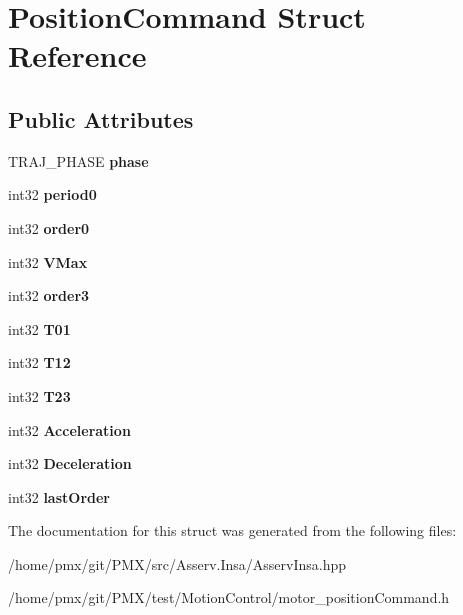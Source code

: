 \hypertarget{structPositionCommand}{}\section{Position\+Command Struct Reference}
\label{structPositionCommand}
\subsection*{Public Attributes}
\begin{DoxyCompactItemize}
\item 
\mbox{\label{structPositionCommand_ad9d68717b1ee8ccb3eb1b2e0083fffc1}} 
T\+R\+A\+J\+\_\+\+P\+H\+A\+SE {\bfseries phase}
\item 
\mbox{\label{structPositionCommand_a3e8302107de7d57977348d9a7909f83a}} 
int32 {\bfseries period0}
\item 
\mbox{\label{structPositionCommand_ab129ddd9246bd3b34c1eb25953fa55cb}} 
int32 {\bfseries order0}
\item 
\mbox{\label{structPositionCommand_a0666309ffc6f6391f4d6b51840ab14bd}} 
int32 {\bfseries V\+Max}
\item 
\mbox{\label{structPositionCommand_a7ea9211a15d2f46e8f9da8b991a314ba}} 
int32 {\bfseries order3}
\item 
\mbox{\label{structPositionCommand_a0417afcbb17f7e70206786a5386a6a63}} 
int32 {\bfseries T01}
\item 
\mbox{\label{structPositionCommand_a5b49d6338b2a25b2eb8906a10a6ca413}} 
int32 {\bfseries T12}
\item 
\mbox{\label{structPositionCommand_ac30b91860c7c4e235aefbf2d2b1b0114}} 
int32 {\bfseries T23}
\item 
\mbox{\label{structPositionCommand_a364b2f85939c31261ca93e1879f4b5cb}} 
int32 {\bfseries Acceleration}
\item 
\mbox{\label{structPositionCommand_a7bb72e231df94b917e1bc1f74f4b6edc}} 
int32 {\bfseries Deceleration}
\item 
\mbox{\label{structPositionCommand_aad10e70ce753984d836bc8cde414fe04}} 
int32 {\bfseries last\+Order}
\end{DoxyCompactItemize}


The documentation for this struct was generated from the following files\+:\begin{DoxyCompactItemize}
\item 
/home/pmx/git/\+P\+M\+X/src/\+Asserv.\+Insa/Asserv\+Insa.\+hpp\item 
/home/pmx/git/\+P\+M\+X/test/\+Motion\+Control/motor\+\_\+position\+Command.\+h\end{DoxyCompactItemize}
